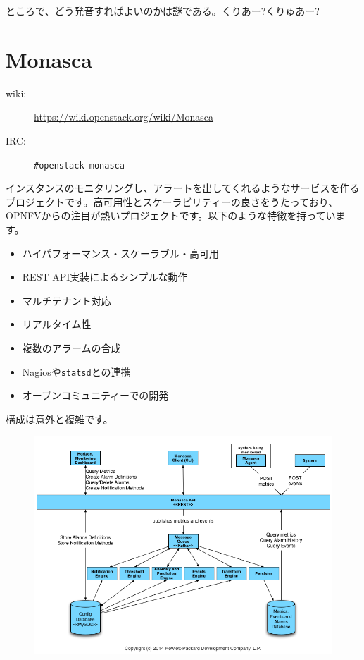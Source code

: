 ところで、どう発音すればよいのかは謎である。くりあー?くりゅあー?

\section{Monasca}

\begin{description}
	\item[wiki:] \url{https://wiki.openstack.org/wiki/Monasca}
	\item[IRC:] \verb|#openstack-monasca|
\end{description}

インスタンスのモニタリングし、アラートを出してくれるようなサービスを作るプロジェクトです。高可用性とスケーラビリティーの良さをうたっており、OPNFVからの注目が熱いプロジェクトです。以下のような特徴を持っています。

\begin{itemize}
	\item ハイパフォーマンス・スケーラブル・高可用
	\item REST API実装によるシンプルな動作
	\item マルチテナント対応
	\item リアルタイム性
	\item 複数のアラームの合成
	\item Nagiosや\verb|statsd|との連携
	\item オープンコミュニティーでの開発
\end{itemize}

構成は意外と複雑です。

\begin{figure}[htb]
	\begin{center}
		\includegraphics[width=\textwidth]{img/Monasca-arch-component-diagram.png}
	\end{center}
\end{figure}

